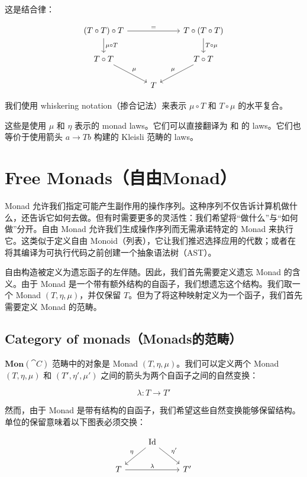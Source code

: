 \documentclass[DaoFP]{subfiles}
\begin{document}
    这是结合律：

    \[
        \begin{tikzcd}
        (T \circ T) \circ T
        \arrow[rr, "="]
        \arrow[d, "\mu \circ T"]
        &&
        T \circ (T \circ T)
        \arrow[d, "T \circ \mu"]
        \\
        T \circ T
        \arrow[dr, "\mu"]
        & & T \circ T
        \arrow[dl, "\mu"']
        \\
        &  T
        \end{tikzcd}
    \]

    我们使用 whiskering notation（掺合记法）来表示 $\mu \circ T$ 和 $T \circ \mu$ 的水平复合。

    这些是使用 $\mu$ 和 $\eta$ 表示的 monad laws。它们可以直接翻译为  和  的 laws。它们也等价于使用箭头 $a \to T b$ 构建的 Kleisli 范畴的 laws。

    \section{Free Monads（自由Monad）}

    Monad 允许我们指定可能产生副作用的操作序列。这种序列不仅告诉计算机做什么，还告诉它如何去做。但有时需要更多的灵活性：我们希望将“做什么”与“如何做”分开。自由 Monad 允许我们生成操作序列而无需承诺特定的 Monad 来执行它。这类似于定义自由 Monoid（列表），它让我们推迟选择应用的代数；或者在将其编译为可执行代码之前创建一个抽象语法树（AST）。

    自由构造被定义为遗忘函子的左伴随。因此，我们首先需要定义遗忘 Monad 的含义。由于 Monad 是一个带有额外结构的自函子，我们想遗忘这个结构。我们取一个 Monad $(T, \eta, \mu)$，并仅保留 $T$。但为了将这种映射定义为一个函子，我们首先需要定义 Monad 的范畴。

    \subsection{Category of monads（Monads的范畴）}

    $\mathbf{Mon}(\cat C)$ 范畴中的对象是 Monad $(T, \eta, \mu)$。我们可以定义两个 Monad $(T, \eta, \mu)$ 和 $(T', \eta', \mu')$ 之间的箭头为两个自函子之间的自然变换：

    \[ \lambda \colon T \to T' \]

    然而，由于 Monad 是带有结构的自函子，我们希望这些自然变换能够保留结构。单位的保留意味着以下图表必须交换：

    \[
        \begin{tikzcd}
            &\text{Id}
            \arrow[ld, "\eta"']
            \arrow[rd, "\eta'"]
            \\
            T
            \arrow[rr, "\lambda"]
            && T'
        \end{tikzcd}
    \]
\end{document}
